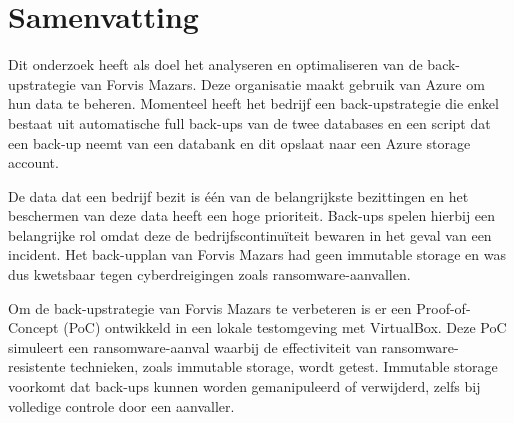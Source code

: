 
%
%
%
%
%

%



\chapter*{Samenvatting}
Dit onderzoek heeft als doel het analyseren en optimaliseren van de back-upstrategie van Forvis Mazars. Deze organisatie maakt gebruik van Azure om hun data te beheren. Momenteel heeft het bedrijf een back-upstrategie die enkel bestaat uit automatische full back-ups van de twee databases en een script dat een back-up neemt van een databank en dit opslaat naar een Azure storage account. 

De data dat een bedrijf bezit is één van de belangrijkste bezittingen en het beschermen van deze data heeft een hoge prioriteit. Back-ups spelen hierbij een belangrijke rol omdat deze de bedrijfscontinuïteit bewaren in het geval van een incident. Het back-upplan van Forvis Mazars had geen immutable storage en was dus kwetsbaar tegen cyberdreigingen zoals ransomware-aanvallen. 

Om de back-upstrategie van Forvis Mazars te verbeteren is er een Proof-of-Concept (PoC) ontwikkeld in een lokale testomgeving met VirtualBox. Deze PoC simuleert een ransomware-aanval waarbij de effectiviteit van ransomware-resistente technieken, zoals immutable storage, wordt getest. Immutable storage voorkomt dat back-ups kunnen worden gemanipuleerd of verwijderd, zelfs bij volledige controle door een aanvaller. 

